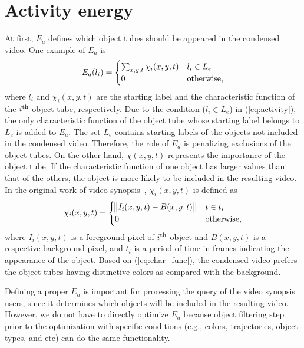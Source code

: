 \documentclass[11pt]{hyu_thesis}
\begin{document}
\section{Activity energy}
At first, $E_a$ defines which object tubes should be appeared in the condensed video. One example of $E_a$ is
\begin{equation}
\label{eq:activity}
E_a(l_i) =
\begin{cases}
\sum_{x,y,t} \chi_i (x,y,t) & l_i \in L_e \\
0 & \rm{otherwise},
\end{cases}
\end{equation}
where $l_i$ and $\chi_i (x,y,t)$ are the starting label and the characteristic function of the $i^{\rm{th}}$ object tube, respectively. Due to the condition ($l_i \in L_e$) in (\ref{eq:activity}), the only characteristic function of the object tube whose starting label belongs to $L_e$ is added to $E_a$. The set $L_e$ contains starting labels of the objects not included in the condensed video. Therefore, the role of $E_a$ is penalizing exclusions of the object tubes. On the other hand, $\chi (x,y,t)$ represents the importance of the object tube. If the characteristic function of one object has larger values than that of the others, the object is more likely to be included in the resulting video. In the original work of video synopsis~\cite{Rav-Acha2006,Pritch2007,Pritch2008}, $\chi_i (x,y,t)$ is defined as
\begin{equation}
\label{eq:char_func}
\chi_i(x,y,t)=
\begin{cases}
\norm{I_i(x,y,t)-B(x,y,t)} & t \in t_i\\
0 & \rm{otherwise},
\end{cases}
\end{equation}
where $I_i(x,y,t)$ is a foreground pixel of $i^{\rm{th}}$ object and $B(x,y,t)$ is a respective background pixel, and $t_i$ is a period of time in frames indicating the appearance of the object. Based on (\ref{eq:char_func}), the condensed video prefers the object tubes having distinctive colors as compared with the background. 

Defining a proper $E_a$ is important for processing the query of the video synopsis users, since it determines which objects will be included in the resulting video. However, we do not have to directly optimize $E_a$ because object filtering step prior to the optimization with specific conditions (e.g., colors, trajectories, object types, and etc) can do the same functionality.
\end{document}
